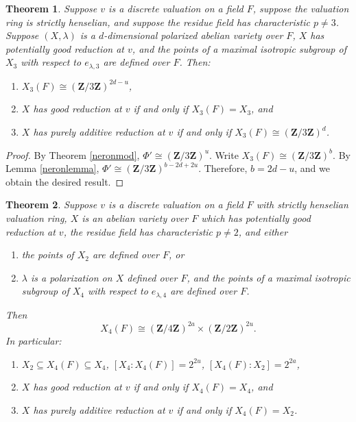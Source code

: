 \documentclass{amsart}
\def\Z{{\mathbf Z}}
\newtheorem{thm}{Theorem}[section]
\theoremstyle{definition}
\begin{document}
\begin{thm}
\label{neron3}
Suppose $v$ is a discrete valuation on a field $F$, suppose
the valuation ring is strictly henselian, and suppose the residue field
has characteristic $p \ne 3$.
Suppose $(X, \lambda)$ is a $d$-dimensional polarized abelian 
variety over $F$, $X$ has potentially good reduction at $v$, and 
the points of a maximal isotropic subgroup of $X_3$ with respect to 
$e_{\lambda,3}$ are defined over $F$. 
Then:
\begin{enumerate}
\item[(i)]  $X_3(F) \cong (\Z/3\Z)^{2d-u}$,  
\item[(ii)] $X$ has good reduction at $v$ if and only if
$X_3(F) = X_3$, and
\item[(iii)] $X$ has purely additive reduction at $v$ if and only if
$X_3(F) \cong (\Z/3\Z)^{d}$.
\end{enumerate}
\end{thm}

\begin{proof} 
By Theorem \ref{neronmod},
$\Phi' \cong (\Z/3\Z)^u$. Write $X_3(F) \cong (\Z/3\Z)^b$.
By Lemma \ref{neronlemma}, 
$\Phi' \cong (\Z/3\Z)^{b-2d+2u}$.
Therefore, $b = 2d - u$, and we obtain the desired result.
\end{proof}

\begin{thm}
\label{neron4}
Suppose $v$ is a discrete valuation on a field $F$ with strictly henselian 
valuation ring, $X$ is an abelian variety over $F$ which has potentially 
good reduction at $v$, the residue field has characteristic $p \ne 2$, 
and either 
\begin{enumerate}
\item[{(a)}] the points of $X_2$ are defined over $F$, or
\item[{(b)}] $\lambda$ is a polarization on $X$ defined over $F$, and 
the points of a maximal isotropic subgroup of $X_4$ with respect to 
$e_{\lambda,4}$ are defined over $F$.
\end{enumerate} 
Then
$$X_4(F) \cong (\Z/4\Z)^{2a} \times (\Z/2\Z)^{2u}.$$
In particular:
\begin{enumerate}
\item[(i)]  $X_2 \subseteq X_4(F) \subseteq X_4$, 
$[X_4 : X_4(F)] = 2^{2u}$, $[X_4(F) : X_2] = 2^{2a}$,
\item[(ii)] $X$ has good reduction at $v$ if and only if
$X_4(F) = X_4$, and
\item[(iii)] $X$ has purely additive reduction at $v$ if and only if
$X_4(F) = X_2$.
\end{enumerate}
\end{thm}
\end{document}
